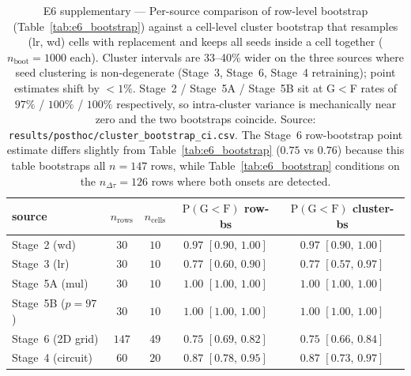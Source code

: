 \documentclass{article}
\newcommand{\Dtau}{\Delta\tau}
\begin{document}
\begin{table}[tbp]
  \centering
  \caption{E6 supplementary --- Per-source comparison of row-level
    bootstrap (Table~\ref{tab:e6_bootstrap}) against a cell-level
    cluster bootstrap that resamples (lr, wd) cells with replacement
    and keeps all seeds inside a cell together
    ($n_{\mathrm{boot}}{=}1000$ each).
    Cluster intervals are 33--40\% wider on the three sources where
    seed clustering is non-degenerate (Stage~3, Stage~6, Stage~4
    retraining); point estimates shift by $<1\%$.
    Stage~2 / Stage~5A / Stage~5B sit at G$<$F rates of
    $97\%$ / $100\%$ / $100\%$ respectively, so intra-cluster variance
    is mechanically near zero and the two bootstraps coincide.
    Source: \texttt{results/posthoc/cluster\_bootstrap\_ci.csv}.
    The Stage~6 row-bootstrap point estimate differs slightly from
    Table~\ref{tab:e6_bootstrap} ($0.75$ vs $0.76$) because this
    table bootstraps all $n{=}147$ rows, while
    Table~\ref{tab:e6_bootstrap} conditions on the
    $n_{\Dtau}{=}126$ rows where both onsets are detected.}
  \label{tab:cluster_bootstrap}
  \small
  \begin{tabular}{lcccc}
    \toprule
    source & $n_{\mathrm{rows}}$ & $n_{\mathrm{cells}}$ &
    $\mathrm{P}(\mathrm{G}{<}\mathrm{F})$ row-bs &
    $\mathrm{P}(\mathrm{G}{<}\mathrm{F})$ cluster-bs \\
    \midrule
    Stage~2 (wd)       & $30$  & $10$ & $0.97$ $[0.90,\,1.00]$ & $0.97$ $[0.90,\,1.00]$ \\
    Stage~3 (lr)       & $30$  & $10$ & $0.77$ $[0.60,\,0.90]$ & $0.77$ $[0.57,\,0.97]$ \\
    Stage~5A (mul)     & $30$  & $10$ & $1.00$ $[1.00,\,1.00]$ & $1.00$ $[1.00,\,1.00]$ \\
    Stage~5B ($p{=}97$)& $30$  & $10$ & $1.00$ $[1.00,\,1.00]$ & $1.00$ $[1.00,\,1.00]$ \\
    Stage~6 (2D grid)  & $147$ & $49$ & $0.75$ $[0.69,\,0.82]$ & $0.75$ $[0.66,\,0.84]$ \\
    Stage~4 (circuit)  & $60$  & $20$ & $0.87$ $[0.78,\,0.95]$ & $0.87$ $[0.73,\,0.97]$ \\
    \bottomrule
  \end{tabular}
\end{table}
\end{document}
